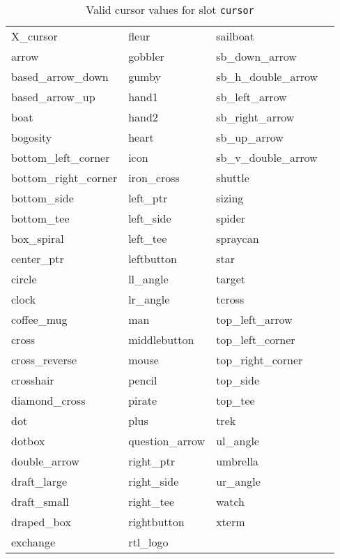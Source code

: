 \begin{table}
{\footnotesize
\begin{center}
\begin{tabular}{|l|l|l|l|} \hline
X\_cursor               & fleur                 & sailboat      \\
arrow                   & gobbler               & sb\_down\_arrow       \\
based\_arrow\_down      & gumby                 & sb\_h\_double\_arrow  \\
based\_arrow\_up                & hand1                 & sb\_left\_arrow       \\
boat                    & hand2                 & sb\_right\_arrow      \\
bogosity                & heart                 & sb\_up\_arrow \\
bottom\_left\_corner    & icon                  & sb\_v\_double\_arrow  \\
bottom\_right\_corner   & iron\_cross           & shuttle       \\
bottom\_side            & left\_ptr             & sizing        \\
bottom\_tee             & left\_side            & spider        \\
box\_spiral             & left\_tee             & spraycan      \\
center\_ptr             & leftbutton            & star  \\
circle                  & ll\_angle             & target        \\
clock                   & lr\_angle             & tcross        \\
coffee\_mug             & man                   & top\_left\_arrow      \\
cross                   & middlebutton          & top\_left\_corner     \\
cross\_reverse          & mouse                 & top\_right\_corner    \\
crosshair               & pencil                & top\_side     \\
diamond\_cross          & pirate                & top\_tee      \\
dot                     & plus                  & trek  \\
dotbox                  & question\_arrow       & ul\_angle     \\
double\_arrow           & right\_ptr            & umbrella      \\
draft\_large            & right\_side           & ur\_angle     \\
draft\_small            & right\_tee            & watch \\
draped\_box             & rightbutton           & xterm \\
exchange                & rtl\_logo             & {\ } \\ \hline 
\end{tabular}
\end{center}
}
\caption {Valid cursor values for slot {\tt cursor}}
\label{cursor-table}
\end{table}
